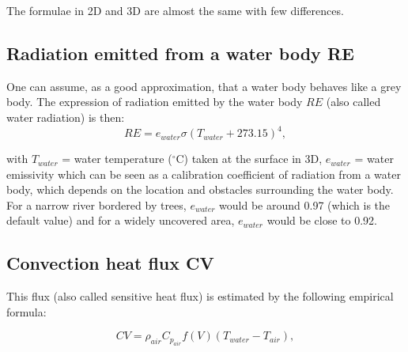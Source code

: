 The formulae in 2D and 3D are almost the same with few differences.


\subsection{Radiation emitted from a water body RE}

One can assume, as a good approximation, that a water body behaves like a grey body.
The expression of radiation emitted by the water body $RE$
(also called water radiation) is then:\\

\begin{equation}
  RE = e_{water} \sigma (T_{water} + 273.15)^4,
\end{equation}

with $T_{water}$ = water temperature ($^{\circ}$C)
taken at the surface in 3D,
$e_{water}$ = water emissivity which can be seen as a
calibration coefficient of radiation from a water body,
which depends on the location and obstacles surrounding the water body.
For a narrow river bordered by trees, $e_{water}$ would be around 0.97
(which is the default value)
and for a widely uncovered area, $e_{water}$ would be close to 0.92.

\subsection{Convection heat flux CV}

This flux (also called sensitive heat flux)
is estimated by the following empirical formula:

\begin{equation}
  CV = \rho_{air} C_{p_{air}} f(V) (T_{water} - T_{air}),
\end{equation}


